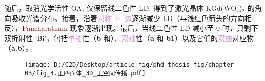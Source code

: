 随后，取消\textcolor{NavyBlue}{光学活性 OA}, 仅保留\textcolor{NavyBlue}{线二色性 LD}, 得到了激光晶体 KGd(WO$_4$)$_2$ 的角向吸收光谱分布\cite{brenierVoigtWaveInvestigation2015,brenierLasingConicalDiffraction2016}。接着，沿着\textcolor{Plum}{对称 `S' 边}逐渐减少 \textcolor{NavyBlue}{LD}（与浅红色箭头的方向相反），\textcolor{Maroon}{Pancharatnam} 现象逐渐出现。最后，当\textcolor{NavyBlue}{线二色性 LD} 减小至 0 时，只剩下\textcolor{NavyBlue}{双折射性 `Bi'}，包括\textcolor{Plum}{单轴}性（\textbf{b} 和）、\textcolor{Plum}{双轴}性（\textbf{a} 和 \textbf{b1}）以及它们的\textcolor{Plum}{双曲}对应物（\textbf{a},\textbf{b}）。

\begin{figure}[htbp!]
	\centering
	\texttt{[image: D:/C2D/Desktop/article\_fig/phd\_thesis\_fig/chapter-03/fig\_4.正四面体\_3D\_正空间传播.pdf]}

\end{figure}
